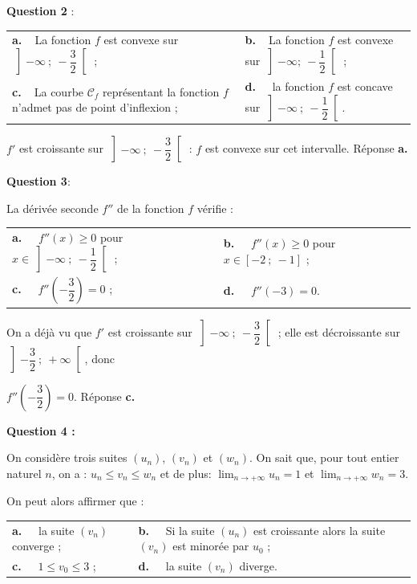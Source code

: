 \textbf{Question 2 }:

\begin{center}
\begin{tabularx}{\linewidth}{X X}
\textbf{a.~~}La fonction $f$ est convexe sur $\left]- \infty~;~- \dfrac32\right[$ ;&
\textbf{b.~~}La fonction $f$ est convexe sur $\left]- \infty;~- \dfrac12\right[$ ;\\
\textbf{c.~~}La courbe $\mathcal{C}_f$ représentant la fonction $f$ n'admet pas de point d'inflexion ; &\textbf{d.~~} la fonction $f$ est concave sur $\left] - \infty~;~- \dfrac12\right[$.
\end{tabularx}
\end{center}

$f'$ est croissante sur $\left]- \infty~;~- \dfrac32\right[$ : $f$ est convexe sur cet intervalle. Réponse \textbf{a.}
\medskip

\textbf{Question 3}:

La dérivée seconde $f''$  de la fonction $f$ vérifie :

\begin{center}
\begin{tabularx}{\linewidth}{X X}
\textbf{a.~~} $f''(x) \geqslant  0$ pour $x \in \left]-\infty~;~- \dfrac12\right[$ ; &\textbf{b.~~} $f''(x) \geqslant  0$ pour $x \in [- 2~;~- 1]$ ;\\
\textbf{c.~~} $f''\left(- \dfrac32 \right) = 0$ ;&\textbf{d.~~} $f''(- 3) = 0$.
\end{tabularx}
\end{center}
On a déjà vu que $f'$ est croissante sur $\left]- \infty~;~- \dfrac32\right[$ ; elle est décroissante sur $\left]- \dfrac32~;~+ \infty\right[$, donc 

$f''\left(- \dfrac32\right) = 0$. Réponse \textbf{c.}

\medskip

\textbf{Question 4 :}

\medskip

On considère trois suites $\left(u_n\right)$, $\left(v_n\right)$ et $\left(w_n\right)$. On sait que, pour tout entier naturel $n$, on a : $u_n \leqslant v_n\leqslant  w_n$ et de plus: $\displaystyle\lim_{n \to + \infty} u_n= 1$ et $\displaystyle\lim_{n \to + \infty} w_n= 3$.

On peut alors affirmer que :

\begin{center}
\begin{tabularx}{\linewidth}{X X}
\textbf{a.~~} la suite $\left(v_n\right)$ converge ;&\textbf{b.~~} Si la suite 
$\left(u_n\right)$ est croissante alors la suite $\left(v_n\right)$ est minorée par $u_0$ ;\\
\textbf{c.~~} $1 \leqslant  v_0 \leqslant 3$ ;&\textbf{d.~~} la suite $\left(v_n\right)$ diverge.
\end{tabularx}
\end{center}

